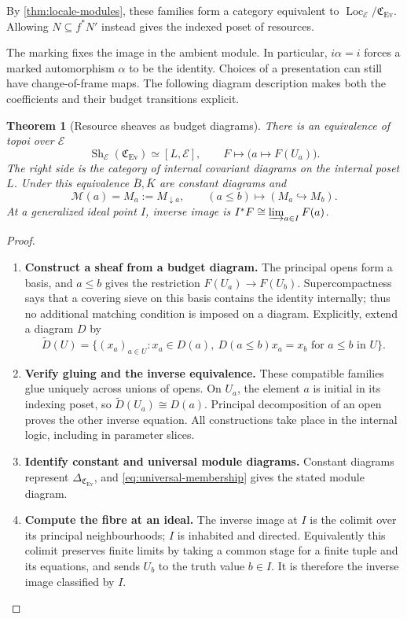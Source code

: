 \documentclass[11pt,a4paper]{article}
\numberwithin{algorithm}{section}
\numberwithin{equation}{section}
\newtheorem{theorem}{Theorem}[section]
\theoremstyle{definition}
\theoremstyle{remark}
\theoremstyle{plain}
\newcommand{\E}{\mathcal E}
\newcommand{\incl}{\hookrightarrow}
\newcommand{\Loc}{\operatorname{Loc}}
\newcommand{\Ev}{{\operatorname{Ev}}}
\newcommand{\Cplx}{\mathfrak C_{\Ev}}
\newcommand{\Sh}{\operatorname{Sh}}
\theoremstyle{definition}
\theoremstyle{plain}
\begin{document}
 By
\cref{thm:locale-modules}, these families form a category equivalent
to $\Loc_\E/\Cplx$. Allowing $N\subseteq f^*N'$ instead gives the
indexed poset of resources.

The marking fixes the image in the ambient module. In particular,
$i\alpha=i$ forces a marked automorphism $\alpha$ to be the identity.
Choices of a presentation can still have change-of-frame maps.
The following diagram description makes both the coefficients and
their budget transitions explicit.

\begin{theorem}[Resource sheaves as budget diagrams]
\label{thm:budget-diagrams}
There is an equivalence of topoi over $\E$
\begin{equation}\label{eq:budget-diagrams}
 \Sh_\E(\Cplx)\simeq[L,\E],\qquad
 F\longmapsto\bigl(a\longmapsto F(U_a)\bigr).
\end{equation}
The right side is the category of internal covariant diagrams on
the internal poset $L$. Under this equivalence $\bar B,\bar K$
are constant diagrams and
\[
 \mathscr M(a)=M_a:=M_{\downarrow a},\qquad
 (a\le b)\longmapsto(M_a\incl M_b).
\]
At a generalized ideal point $I$, inverse image is
$I^*F\cong\varinjlim_{a\in I}F(a)$.
\end{theorem}
\begin{proof}\leavevmode
\begin{enumerate}[leftmargin=*,align=left]
\item \textbf{Construct a sheaf from a budget diagram.}
The principal opens form a basis, and $a\le b$ gives the restriction
$F(U_a)\to F(U_b)$. Supercompactness says that a covering sieve on
this basis contains the identity internally; thus no additional
matching condition is imposed on a diagram. Explicitly, extend a
diagram $D$ by
\[
 \widetilde D(U)=\{(x_a)_{a\in U}:x_a\in D(a),\
            D(a\le b)x_a=x_b\text{ for }a\le b\text{ in }U\}.
\]

\item \textbf{Verify gluing and the inverse equivalence.}
These compatible families glue uniquely across unions of opens.
On $U_a$, the element $a$ is initial in its indexing poset, so
$\widetilde D(U_a)\cong D(a)$. Principal decomposition of an open
proves the other inverse equation. All constructions take place
in the internal logic, including in parameter slices.

\item \textbf{Identify constant and universal module diagrams.}
Constant diagrams represent $\Delta_{\Cplx}$, and
\eqref{eq:universal-membership} gives the stated module diagram.

\item \textbf{Compute the fibre at an ideal.}
The inverse image at $I$ is the colimit over its principal
neighbourhoods; $I$ is inhabited and directed. Equivalently this
colimit preserves finite limits by taking a common stage for a
finite tuple and its equations, and sends $U_b$ to the truth value
$b\in I$. It is therefore the inverse image classified by $I$.
\end{enumerate}
\end{proof}
\end{document}
